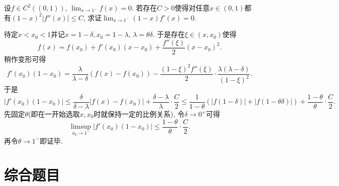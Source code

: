 \begin{exercise} \label{ex:于品p206_C6}
	设$f \in C^2((0,1))$, $\lim_{x \to 1^-}f(x)=0$. 若存在$C>0$使得对任意$x \in (0,1)$都有$(1-x)^2|f''(x)| \leq C$, 求证$\lim_{x \to 1^-}(1-x)f'(x)=0$. 
\end{exercise}
\begin{solution}
	待定$x<x_0<1$并记$x=1-\delta ,x_0=1-\lambda$, $\lambda = \theta \delta$. 于是存在$\xi \in (x,x_0)$使得$$f(x) = f(x_0) + f'(x_0)(x-x_0) + \frac{f''(\xi)}{2}(x-x_0)^2.$$
	稍作变形可得$$f'(x_0)(1-x_0) = \frac{\lambda}{\lambda - \delta}(f(x)-f(x_0)) - \frac{(1-\xi)^2f''(\xi)}{2} \cdot \frac{\lambda (\lambda -\delta)}{(1-\xi)^2}.$$
	于是$$|f'(x_0)(1-x_0)| \leq \frac{\delta}{\delta - \lambda} |f(x)-f(x_0)| + \frac{\delta -\lambda}{\lambda} \cdot \frac{C}{2} \leq \frac{1}{1-\theta} (|f(1-\delta)| + |f(1-\theta \delta)|) + \frac{1-\theta}{\theta} \cdot \frac{C}{2}. $$
	先固定$\theta$(即在一开始选取$x,x_0$时就保持一定的比例关系), 令$\delta \to 0^+$可得$$\limsup_{x_0 \to 1^-}|f'(x_0)(1-x_0)| \leq \frac{1-\theta}{\theta} \cdot \frac{C}{2}. $$
	再令$\theta \to 1^-$即证毕. 
\end{solution}


\section{综合题目}

